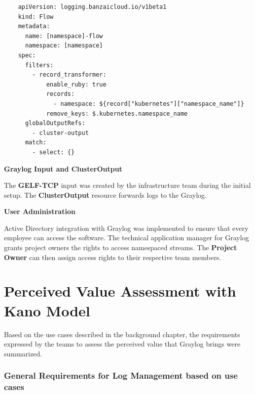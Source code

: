 \documentclass[../main.tex]{subfiles}
\begin{document}
\begin{verbatim}
    apiVersion: logging.banzaicloud.io/v1beta1
    kind: Flow
    metadata:
      name: [namespace]-flow
      namespace: [namespace]
    spec:
      filters:
        - record_transformer:
            enable_ruby: true
            records:
              - namespace: ${record["kubernetes"]["namespace_name"]}
            remove_keys: $.kubernetes.namespace_name
      globalOutputRefs:
        - cluster-output
      match:
        - select: {}
\end{verbatim}

\textbf{Graylog Input and ClusterOutput}

The \textbf{GELF-TCP} input was created by the infrastructure team during the initial setup. The \textbf{ClusterOutput} resource forwards logs to the Graylog.

\textbf{User Administration}

Active Directory integration with Graylog was implemented to ensure that every employee can access the software. The technical application manager for Graylog grants project owners the rights to access namespaced streams. The \textbf{Project Owner} can then assign access rights to their respective team members.

\section{Perceived Value Assessment with Kano Model}

Based on the use cases described in the background chapter, the requirements expressed by the teams to assess the perceived value that Graylog brings were summarized.

\subsubsection{General Requirements for Log Management based on use cases}
\end{document}
